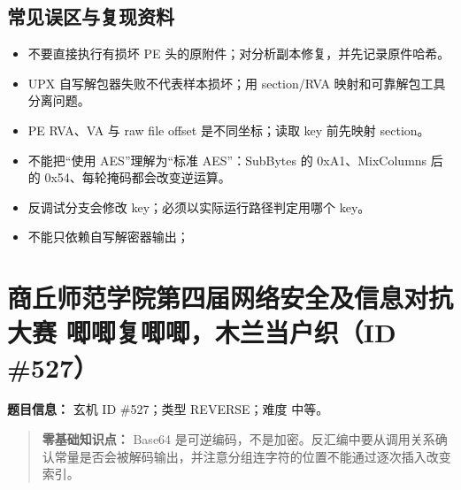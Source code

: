 \subsection{常见误区与复现资料}\label{ux5e38ux89c1ux8befux533aux4e0eux590dux73b0ux8d44ux6599}

\begin{itemize}
\tightlist
\item
  不要直接执行有损坏 PE 头的原附件；对分析副本修复，并先记录原件哈希。
\item
  UPX 自写解包器失败不代表样本损坏；用 section/RVA 映射和可靠解包工具分离问题。
\item
  PE RVA、VA 与 raw file offset 是不同坐标；读取 key 前先映射 section。
\item
  不能把``使用 AES''理解为``标准 AES''：SubBytes 的 0xA1、MixColumns 后的 0x54、每轮掩码都会改变逆运算。
\item
  反调试分支会修改 key；必须以实际运行路径判定用哪个 key。
\item
  不能只依赖自写解密器输出；
\end{itemize}

\section{商丘师范学院第四届网络安全及信息对抗大赛 唧唧复唧唧，木兰当户织（ID \#527）}\label{ux5546ux4e18ux5e08ux8303ux5b66ux9662ux7b2cux56dbux5c4aux7f51ux7edcux5b89ux5168ux53caux4fe1ux606fux5bf9ux6297ux5927ux8d5b-ux5527ux5527ux590dux5527ux5527ux6728ux5170ux5f53ux6237ux7ec7id-527}

\textbf{题目信息：} 玄机 ID \#527；类型 REVERSE；难度 中等。

\begin{quote}
\textbf{零基础知识点：} Base64 是可逆编码，不是加密。反汇编中要从调用关系确认常量是否会被解码输出，并注意分组连字符的位置不能通过逐次插入改变索引。
\end{quote}

